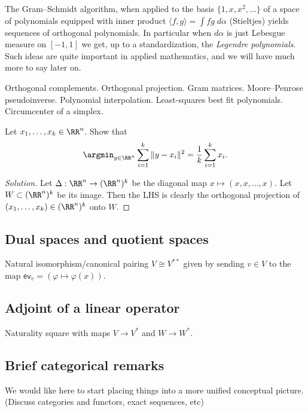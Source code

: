 \begin{remark}
The Gram--Schmidt algorithm, when applied to the basis $\{ 1, x, x^2, \ldots \}$ of a space of polynomials equipped with inner product $\langle f,g \rangle = \int fg \; d \alpha$ (Stieltjes) yields sequences of orthogonal polynomials. In particular when $d \alpha$ is just Lebesgue measure on $[-1,1]$ we get, up to a standardization, the \emph{Legendre polynomials}. Such ideas are quite important in applied mathematics, and we will have much more to say later on.
\end{remark}

Orthogonal complements. Orthogonal projection. Gram matrices. Moore--Penrose pseudoinverse. Polynomial interpolation. Least-squares best fit polynomials. Circumcenter of a simplex.

\begin{example}
Let $x_1, \ldots, x_k \in \RR^n$. Show that
\[ \argmin_{y \in \RR^n} \sum_{i=1}^k \| y - x_i \|^2 = \frac{1}{k} \sum_{i=1}^k x_i. \]
\end{example}

\begin{proof}[Solution]
Let $\Delta : \RR^n \to (\RR^n)^k$ be the diagonal map $x \mapsto (x,x,\ldots,x)$. Let $W \subset (\RR^n)^k$ be its image. Then the LHS is clearly the orthogonal projection of $(x_1,\ldots,x_k) \in (\RR^n)^k$ onto $W$.
\end{proof}

\subsection{Dual spaces and quotient spaces}

Natural isomorphism/canonical pairing $V \cong V^{**}$ given by sending $v \in V$ to the map $\mathsf{ev}_v = (\varphi \mapsto \varphi(x))$.

\subsection{Adjoint of a linear operator}

Naturality square with maps $V \to V^*$ and $W \to W^*$.

\subsection{Brief categorical remarks}

We would like here to start placing things into a more unified conceptual picture. (Discuss categories and functors, exact sequences, etc)

